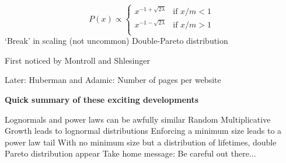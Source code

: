     $$
    P(x) 
    \propto
    \left\{
      \begin{array}{cl}
        x^{-1 + \sqrt{2\lambda}} & \mbox{if $x/m<1$} \\
        x^{-1 - \sqrt{2\lambda}} & \mbox{if $x/m>1$} \\
      \end{array}
    \right.
    $$
   \alert{`Break' in scaling} (not uncommon)
   Double-Pareto distribution
  
    First noticed by Montroll and Shlesinger\cite{montroll1982a,montroll1983a}
   
    Later: Huberman and Adamic\cite{huberman1999a,huberman2000a}: Number of pages per website
  


  \textbf{Quick summary of these exciting developments}
  
  
   Lognormals and power laws can be awfully similar
   Random Multiplicative Growth leads to lognormal distributions
   Enforcing a minimum size leads to a power law tail
   With no minimum size but a distribution of lifetimes, 
    double Pareto distribution appear
   Take home message: Be careful out there...
  

  

